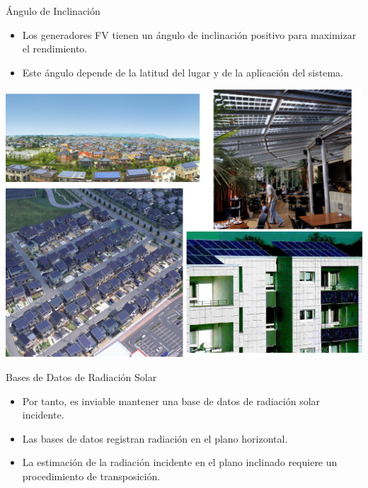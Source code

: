 \documentclass[xcolor={usenames,svgnames,dvipsnames}]{beamer}
\begin{document}
\begin{frame}[label={sec:org2f104d1}]{Ángulo de Inclinación}
\begin{itemize}
\item Los generadores FV tienen un \alert{ángulo de inclinación positivo} para maximizar el rendimiento.
\item Este ángulo depende de la \alert{latitud} del lugar y de la \alert{aplicación del sistema}.
\end{itemize}

\begin{center}
\includegraphics[height=0.5\textheight]{../figs/PVUrban.png}
\end{center}
\end{frame}

\begin{frame}[label={sec:orgc085208}]{Bases de Datos de Radiación Solar}
\begin{itemize}
\item Por tanto, es inviable mantener una base de datos de radiación solar \alert{incidente}.
\item Las \alert{bases de datos} registran radiación en el \alert{plano horizontal}.
\item La estimación de la radiación incidente en el plano inclinado requiere un \alert{procedimiento de transposición}.
\end{itemize}
\end{frame}
\end{document}
